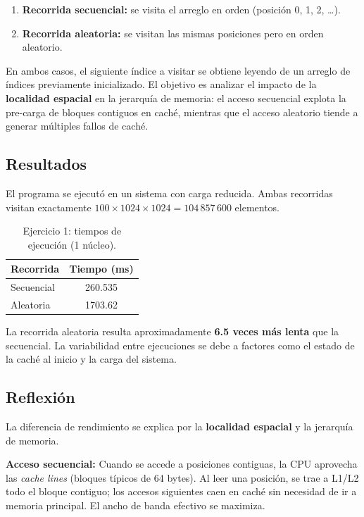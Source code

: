 \documentclass[11pt,a4paper]{article}
\begin{document}
\begin{enumerate}
\item \textbf{Recorrida secuencial:} se visita el arreglo en orden (posición 0, 1, 2, \ldots).
\item \textbf{Recorrida aleatoria:} se visitan las mismas posiciones pero en orden aleatorio.
\end{enumerate}

En ambos casos, el siguiente índice a visitar se obtiene leyendo de un arreglo de índices previamente inicializado. El objetivo es analizar el impacto de la \textbf{localidad espacial} en la jerarquía de memoria: el acceso secuencial explota la pre-carga de bloques contiguos en caché, mientras que el acceso aleatorio tiende a generar múltiples fallos de caché.

\subsection*{Resultados}

El programa se ejecutó en un sistema con carga reducida. Ambas recorridas visitan exactamente \(100 \times 1024 \times 1024 = 104\,857\,600\) elementos.

\begin{table}[htbp]
\centering
\begin{tabular}{@{}lc@{}}
\toprule
\textbf{Recorrida} & \textbf{Tiempo (ms)} \\
\midrule
Secuencial         & 260.535              \\
Aleatoria          & 1703.62              \\
\bottomrule
\end{tabular}
\caption{Ejercicio 1: tiempos de ejecución (1 núcleo).}
\label{tab:tiempos}
\end{table}

La recorrida aleatoria resulta aproximadamente \textbf{6.5 veces más lenta} que la secuencial. La variabilidad entre ejecuciones se debe a factores como el estado de la caché al inicio y la carga del sistema.

\subsection*{Reflexión}

La diferencia de rendimiento se explica por la \textbf{localidad espacial} y la jerarquía de memoria.

\textbf{Acceso secuencial:} Cuando se accede a posiciones contiguas, la CPU aprovecha las \emph{cache lines} (bloques típicos de 64 bytes). Al leer una posición, se trae a L1/L2 todo el bloque contiguo; los accesos siguientes caen en caché sin necesidad de ir a memoria principal. El ancho de banda efectivo se maximiza.
\end{document}

